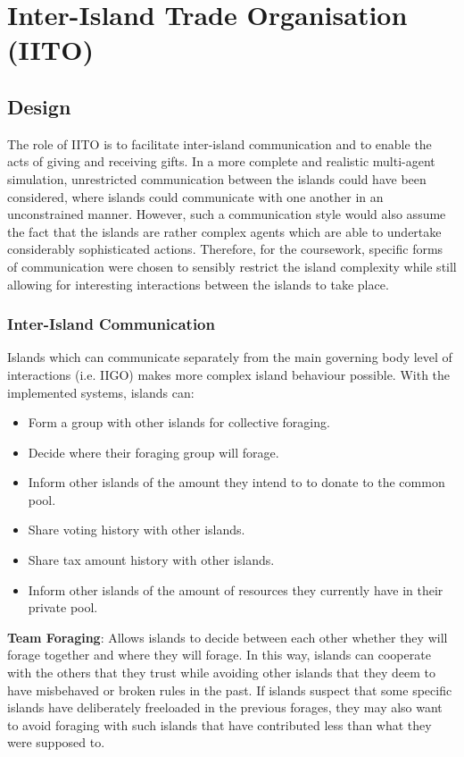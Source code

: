 \chapter{Inter-Island Trade Organisation (IITO)}

\section{Design}
\label{sec:IITO:Design}

The role of IITO is to facilitate inter-island communication and to enable the acts of giving and receiving gifts. In a more complete and realistic multi-agent simulation, unrestricted communication between the islands could have been considered, where islands could communicate with one another in an unconstrained manner. However, such a communication style would also assume the fact that the islands are rather complex agents which are able to undertake considerably sophisticated actions. Therefore, for the coursework, specific forms of communication were chosen to sensibly restrict the island complexity while still allowing for interesting interactions between the islands to take place.

\subsection{Inter-Island Communication}  
\label{subsec:IITO:inter_island_communication}

Islands which can communicate separately from the main governing body level of interactions (i.e. IIGO) makes more complex island behaviour possible. With the implemented systems, islands can:

\begin{itemize}
    \item Form a group with other islands for collective foraging.
    \item Decide where their foraging group will forage.
    \item Inform other islands of the amount they intend to to donate to the common pool.
    \item Share voting history with other islands.
    \item Share tax amount history with other islands.
    \item Inform other islands of the amount of resources they currently have in their private pool.
\end{itemize}

\textbf{Team Foraging}: Allows islands to decide between each other whether they will forage together and where they will forage. In this way, islands can cooperate with the others that they trust while avoiding other islands that they deem to have misbehaved or broken rules in the past. If islands suspect that some specific islands have deliberately freeloaded in the previous forages, they may also want to avoid foraging with such islands that have contributed less than what they were supposed to.

